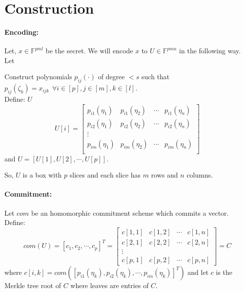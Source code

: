 \documentclass{article}
\newcommand{\mycomment}[1] {\textcolor{blue}  {{\sl{#1}}}}
\begin{document}


\section{Construction}




\paragraph{Encoding:}
Let, $x\in \mathbb{F}^{pml}$ %
be the secret. We will encode $x$ to $U\in \mathbb{F}^{pmn}$ in the following way.\\
Let


Construct polynomials $p_{ij}(\cdot)$ %
of degree $< s$ such that 
$ p_{ij}(\zeta_k)=x_{ijk} ~~\forall i\in [p], j\in [m], k\in [l]$.\\
Define:  $U$ %
$$U[i]=
\begin{bmatrix}
	p_{i1}(\eta_1) & p_{i1}(\eta_2) & \cdots & p_{i1}(\eta_n)\\
	p_{i2}(\eta_1) & p_{i2}(\eta_2) & \cdots & p_{i2}(\eta_n)\\
	\vdots\\
	p_{im}(\eta_1) & p_{im}(\eta_2) & \cdots & p_{im}(\eta_n)\\
\end{bmatrix}
$$
and $U=[U[1], U[2], \cdots, U[p]]$.

So, $U$ is a box with $p$ slices and each slice has $m$ rows and $n$ columns.

\paragraph{Commitment:} Let $com$ be an homomorphic commitment scheme which commits a vector. Define:
$$com(U)= [c_1,c_2,\cdots , c_p]^T=
 \begin{bmatrix} 
c[1,1] & c[1,2] & \cdots & c[1,n] \\
c[2,1] & c[2,2] & \cdots & c[2,n] \\
\vdots\\
c[p,1] & c[p,2] & \cdots & c[p,n]
\end{bmatrix}
=C$$
where $c[i,k]=com([p_{i1}(\eta_k),p_{i2}(\eta_k),\cdots , p_{im}(\eta_k)]^T)$ and let $c$ is the Merkle tree root of $C$ where leaves are entries of $C$.
\end{document}
